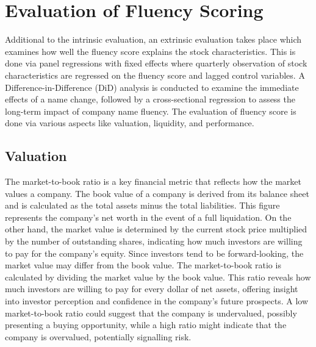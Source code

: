 \documentclass[a4paper,11pt]{report}
\begin{document}
\section{Evaluation of Fluency Scoring} \label{evaluation_fluency_score}
Additional to the intrinsic evaluation, an extrinsic evaluation takes place which examines how well the fluency score explains the stock characteristics. This is done via panel regressions with fixed effects where quarterly observation of stock characteristics are regressed on the fluency score and lagged control variables. A Difference-in-Difference (DiD) analysis is conducted to examine the immediate effects of a name change, followed by a cross-sectional regression to assess the long-term impact of company name fluency. The evaluation of fluency score is done via various aspects like valuation, liquidity, and performance.

\subsection{Valuation}
The market-to-book ratio is a key financial metric that reflects how the market values a company. The book value of a company is derived from its balance sheet and is calculated as the total assets minus the total liabilities. This figure represents the company’s net worth in the event of a full liquidation. On the other hand, the market value is determined by the current stock price multiplied by the number of outstanding shares, indicating how much investors are willing to pay for the company’s equity. Since investors tend to be forward-looking, the market value may differ from the book value. The market-to-book ratio is calculated by dividing the market value by the book value. This ratio reveals how much investors are willing to pay for every dollar of net assets, offering insight into investor perception and confidence in the company’s future prospects. A low market-to-book ratio could suggest that the company is undervalued, possibly presenting a buying opportunity, while a high ratio might indicate that the company is overvalued, potentially signalling risk.
\end{document}

